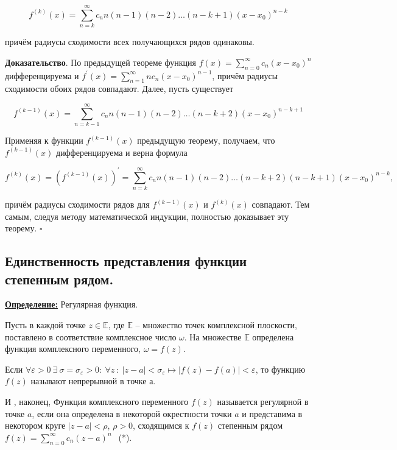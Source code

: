 \documentclass[a4paper,12pt]{article} %
\renewcommand {\epsilon}{\varepsilon}
\begin{document}
\begin{equation*}
f^{(k)}(x)=\sum\limits_{n=k}^{\infty} c_{n} n(n-1)(n-2) \ldots(n-k+1)\left(x-x_{0}\right)^{n-k}
\end{equation*}

причём радиусы сходимости всех получающихся рядов одинаковы.

\textbf{Доказательство}. По предыдущей теореме функция $f(x)=\sum\limits_{n=0}^{\infty} c_{n}\left(x-x_{0}\right)^{n}$ дифференцируема и $f^{\prime}(x)=\sum\limits_{n=1}^{\infty} n c_{n}\left(x-x_{0}\right)^{n-1}$, причём радиусы сходимости обоих рядов совпадают. Далее, пусть существует

\begin{equation*}
f^{(k-1)}(x)=\sum\limits_{n=k-1}^{\infty} c_{n} n(n-1)(n-2) \ldots(n-k+2)\left(x-x_{0}\right)^{n-k+1}
\end{equation*}

Применяя к функции $f^{(k-1)}(x)$ предыдущую теорему, получаем, что $f^{(k-1)}(x)$ дифференцируема и верна формула

\begin{equation*}
f^{(k)}(x)=\left(f^{(k-1)}(x)\right)^{\prime}=\sum\limits_{n=k}^{\infty} c_{n} n(n-1)(n-2) \ldots(n-k+2)(n-k+1)\left(x-x_{0}\right)^{n-k},
\end{equation*}

причём радиусы сходимости рядов для $f^{(k-1)}(x)$ и $f^{(k)}(x)$ совпадают. Тем самым, следуя методу математической индукции, полностью доказывает эту теорему. $\square$


\subsection{Единственность представления функции степенным рядом.}

\underline{\textbf{Определение:}} Регулярная функция.

Пусть в каждой точке $z \in \mathbb{E}$, где $\mathbb{E}$ -- множество точек комплексной плоскости, поставлено в соответствие комплексное число $\omega$. На множестве $\mathbb{E}$ определена функция комплексного переменного, $\omega = f(z)$.

Если $\forall \epsilon > 0\ \exists \ \sigma = \sigma_{\epsilon} > 0:\ \forall z\ :\ |z - a| < \sigma_{\epsilon} \longmapsto |f(z) - f(a)| < \epsilon$, то функцию $f(z)$ называют непрерывной в точке а.

И , наконец, Функция комплексного переменного $f(z)$ называется регулярной в точке $a$, если она определена в некоторой окрестности точки $a$ и представима в некотором круге $|z - a| < \rho$, $\rho > 0$, сходящимся к $f(z)$ степенным рядом $f(z) = \sum\limits_{n = 0}^{\infty} c_n(z-a)^n\ \ $ (*).\\
\end{document}
